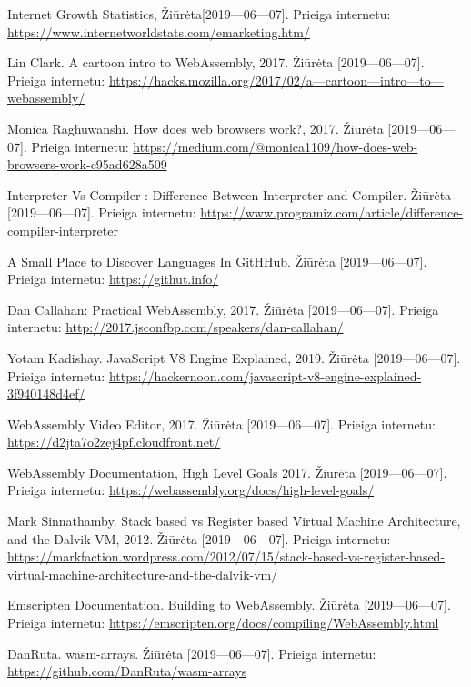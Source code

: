 \documentclass{VUMIFPSkursinis}
\begin{document}
\begin{thebibliography}{99}

Internet Growth Statistics, Žiūrėta[2019—06—07].  Prieiga internetu: \url{https://www.internetworldstats.com/emarketing.htm/}

Lin Clark. A cartoon intro to WebAssembly, 2017. Žiūrėta [2019—06—07].  Prieiga internetu: \url{https://hacks.mozilla.org/2017/02/a—cartoon—intro—to—webassembly/}

Monica Raghuwanshi. How does web browsers work?, 2017. Žiūrėta [2019—06—07].  Prieiga internetu: \url{https://medium.com/@monica1109/how-does-web-browsers-work-c95ad628a509}

Interpreter Vs Compiler : Difference Between Interpreter and Compiler. Žiūrėta [2019—06—07].  Prieiga internetu: \url{https://www.programiz.com/article/difference-compiler-interpreter}

A Small Place to Discover Languages In GitHHub. Žiūrėta [2019—06—07].  Prieiga internetu: \url{https://githut.info/}

Dan Callahan: Practical WebAssembly, 2017. Žiūrėta [2019—06—07].  Prieiga internetu: \url{http://2017.jsconfbp.com/speakers/dan-callahan/}

Yotam Kadishay. JavaScript V8 Engine Explained, 2019. Žiūrėta [2019—06—07].  Prieiga internetu: \url{https://hackernoon.com/javascript-v8-engine-explained-3f940148d4ef/}

WebAssembly Video Editor, 2017. Žiūrėta [2019—06—07].  Prieiga internetu: \url{https://d2jta7o2zej4pf.cloudfront.net/}

WebAssembly Documentation, High Level Goals 2017. Žiūrėta [2019—06—07].  Prieiga internetu: \url{https://webassembly.org/docs/high-level-goals/}

Mark Sinnathamby. Stack based vs Register based Virtual Machine Architecture, and the Dalvik VM, 2012. Žiūrėta [2019—06—07].  Prieiga internetu: \url{https://markfaction.wordpress.com/2012/07/15/stack-based-vs-register-based-virtual-machine-architecture-and-the-dalvik-vm/}

Emscripten Documentation. Building to WebAssembly. Žiūrėta [2019—06—07].  Prieiga internetu: \url{https://emscripten.org/docs/compiling/WebAssembly.html}

DanRuta. wasm-arrays. Žiūrėta [2019—06—07].  Prieiga internetu: \url{https://github.com/DanRuta/wasm-arrays}


\end{thebibliography}
\end{document}

